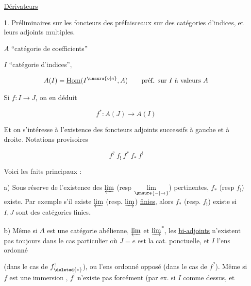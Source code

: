
\uline{Dérivateurs}

1. Préliminaires sur les foncteurs   des préfaisceaux sur des catégories d'indices, et leurs adjoints multiples.

$A$ ``catégorie de coefficients''

$I$ ``catégorie d'indices'',

\[
A(I)=\underline{\mathrm{Hom}}(I^{\unsure{\circ|o}},A)\qquad\text{préf. sur }I\ \text{à valeurs }A
\]

Si $f:I\longrightarrow J$, on en déduit

\[
f^{*}:A(J)\longrightarrow A(I)
\]

Et on s'intéresse à l'existence des foncteurs adjoints successifs à gauche et à droite. Notations provisoires

\[
f^{?}\ f_{!}\ f^{*}\ f_{*}\ f^{!}
\]

Voici les faits principaux :

a) Sous réserve de l'existence des $\varprojlim$ (resp $\underset{\unsure{-|\to}}{\lim}$) pertinentes, $f_{*}$ (resp $f_{!}$) existe. Par exemple s'il existe $\varprojlim$ (resp. $\varinjlim$) \uline{finies}, alors $f_{*}$ (resp. $f_{!}$) existe si $I,J$ sont des catégories finies.

b) Même si $A$ est une catégorie abélienne,  $\varprojlim$ et $\varinjlim$\textsuperscript{*}, les \uline{bi-adjoints} n'existent pas toujours   dans le cas particulier où $J=e$ est la cat. ponctuelle, et $I$ l'ens ordonné


(dans le cas de $f_{\deleted{*}}^{!}$), ou l'ens ordonné opposé (dans le cas de $f^{?}$). Même si  $f$ est une immersion , $f^{!}$ n'existe pas forcément (par ex.  si $I$ comme dessus, et


